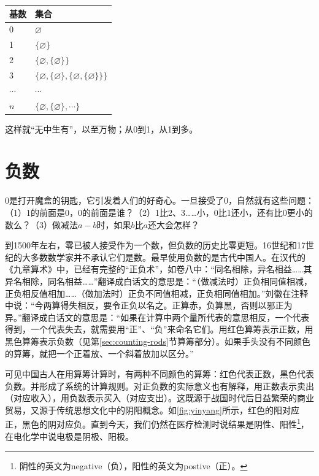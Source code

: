 \documentclass[b5paper]{ctexart}
\begin{document}
\begin{tabular}{l|l}
  基数 & 集合 \\
  \hline
  0 & $\varnothing$ \\
  1 & $\{ \varnothing \}$ \\
  2 & $\{ \varnothing, \{ \varnothing \} \}$ \\
  3 & $\{ \varnothing, \{ \varnothing \}, \{ \varnothing, \{ \varnothing \} \}\}$ \\
  $\cdots$ & $\cdots$ \\
  $n$ & $\{ \varnothing, \{ \varnothing \}, \cdots \}$
\end{tabular}

这样就“无中生有”，以至万物；从0到1，从1到多。

\section{负数}

0是打开魔盒的钥匙，它引发着人们的好奇心。一旦接受了0，自然就有这些问题：（1）1的前面是0，0的前面是谁？（2）1比2、3……小，0比1还小，还有比0更小的数么？（3）做减法$a -b$时，如果$b$比$a$还大会怎样？

  
到1500年左右，零已被人接受作为一个数，但负数的历史比零更短。16世纪和17世纪的大多数数学家并不承认它们是数。最早使用负数的是古代中国人。在汉代的《九章算术》中，已经有完整的“正负术”，如卷八中：“同名相除，异名相益……其异名相除，同名相益……”翻译成白话文的意思是：“（做减法时）正负相同值相减，正负相反值相加……（做加法时）正负不同值相减，正负相同值相加。”刘徽在注释中说：“今两算得失相反，要令正负以名之。正算赤，负算黑，否则以邪正为异。”翻译成白话文的意思是：“如果在计算中两个量所代表的意思相反，一个代表得到，一个代表失去，就需要用“正”、“负”来命名它们。用红色算筹表示正数，用黑色算筹表示负数（见第\ref{sec:counting-rods}节算筹部分）。如果手头没有不同颜色的算筹，就把一个正着放、一个斜着放加以区分。”\cite{Jiuzhang-2009}

可见中国古人在用算筹计算时，有两种不同颜色的算筹：红色代表正数，黑色代表负数。并形成了系统的计算规则。对正负数的实际意义也有解释，用正数表示卖出（对应收入），用负数表示买入（对应支出）。这既源于战国时代后日益繁荣的商业贸易，又源于传统思想文化中的阴阳概念。如\cref{fig:yinyang}所示，红色的阳对应正，黑色的阴对应负。直到今天，我们仍然在医疗检测时说结果是阴性、阳性\footnote{阴性的英文为negative（负），阳性的英文为postive（正）。}，在电化学中说电极是阴极、阳极。
\end{document}
